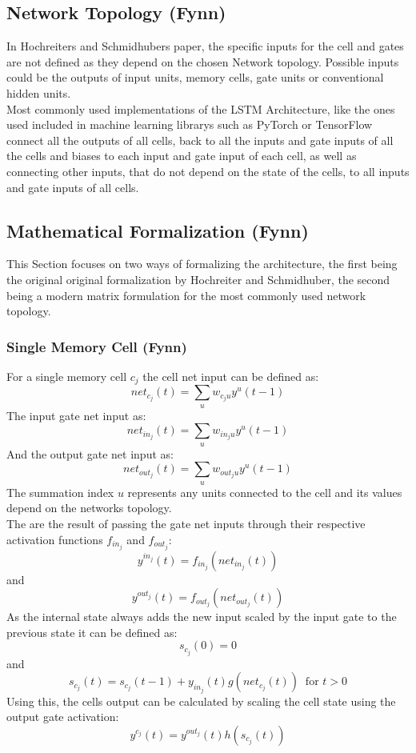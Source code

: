 \documentclass[twoside,a4paper,10pt,DIV=12,BCOR=12mm]{scrartcl}
\begin{document}
\subsection{Network Topology (Fynn)}

In Hochreiters and Schmidhubers paper, the specific inputs for the cell and gates are not defined as they depend on the chosen Network topology. Possible inputs could be the outputs of input units, memory cells, gate units or conventional hidden units.\cite{hochreiter1997lstm}\\
Most commonly used implementations of the LSTM Architecture, like the ones used included in machine learning librarys such as PyTorch or TensorFlow connect all the outputs of all cells, back to all the inputs and gate inputs of all the cells and biases to each input and gate input of each cell, as well as connecting other inputs, that do not depend on the state of the cells, to all inputs and gate inputs of all cells. \cite{smagulova2019notation, keras-lstm, real-pytorch-lstm, pytorch-lstm}

\subsection{Mathematical Formalization (Fynn)}

This Section focuses on two ways of formalizing the architecture, the first being the original original formalization by Hochreiter and Schmidhuber, the second being a modern matrix formulation for the most commonly used network topology.

\subsubsection{Single Memory Cell (Fynn)}
For a single memory cell $c_j$ the cell net input can be defined as:\cite{hochreiter1997lstm}
$$net_{c_j}(t)=\sum_u w_{c_ju}y^u (t-1)$$
The input gate net input as:\cite{hochreiter1997lstm}
$$net_{in_j}(t)=\sum_u w_{in_j u}y^u(t-1)$$
And the output gate net input as:\cite{hochreiter1997lstm}
$$net_{out_j}(t)=\sum_uw_{out_j u}y^u(t-1)$$
The summation index $u$ represents any units connected to the cell and its values depend on the networks topology.\cite{hochreiter1997lstm} \\
The are the result of passing the gate net inputs through their respective activation functions $f_{in_j}$ and $f_{out_j}$:\cite{hochreiter1991}
$$y^{in_j}(t)=f_{in_j}\left(net_{in_j}(t)\right)$$
and
$$y^{out_j}(t)=f_{out_j}\left(net_{out_j}(t)\right)$$
As the internal state always adds the new input scaled by the input gate to the previous state it can be defined as:\cite{hochreiter1997lstm}
$$s_{c_j}(0)=0$$
and
$$s_{c_j}(t)=s_{c_j}(t-1)+y_{in_j}(t)g\left(net_{c_j}(t)\right)\ \text{ for } t>0$$
Using this, the cells output can be calculated by scaling the cell state using the output gate activation:\cite{hochreiter1997lstm}
$$y^{c_j}(t)=y^{out_j}(t)h\left(s_{c_j}(t)\right)$$
\end{document}
